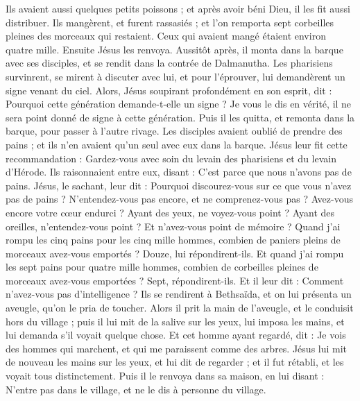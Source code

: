 \begin{multicols}{2}
Ils avaient aussi quelques petits poissons ; et après avoir béni Dieu, il les fit aussi distribuer.
Ils mangèrent, et furent rassasiés ; et l’on remporta sept corbeilles pleines des morceaux qui restaient.
Ceux qui avaient mangé étaient environ quatre mille. Ensuite Jésus les renvoya.
Aussitôt après, il monta dans la barque avec ses disciples, et se rendit dans la contrée de Dalmanutha.
Les pharisiens survinrent, se mirent à discuter avec lui, et pour l'éprouver, lui demandèrent un signe venant du ciel.
Alors, Jésus soupirant profondément en son esprit, dit : Pourquoi cette génération demande-t-elle un signe ? Je vous le dis en vérité, il ne sera point donné de signe à cette génération.
Puis il les quitta, et remonta dans la barque, pour passer à l'autre rivage.
Les disciples avaient oublié de prendre des pains ; et ils n'en avaient qu'un seul avec eux dans la barque.
Jésus leur fit cette recommandation : Gardez-vous avec soin du levain des pharisiens et du levain d'Hérode.
Ils raisonnaient entre eux, disant : C'est parce que nous n'avons pas de pains.
Jésus, le sachant, leur dit : Pourquoi discourez-vous sur ce que vous n'avez pas de pains ? N’entendez-vous pas encore, et ne comprenez-vous pas ?
Avez-vous encore votre cœur endurci ? Ayant des yeux, ne voyez-vous point ? Ayant des oreilles, n'entendez-vous point ? Et n'avez-vous point de mémoire ?
Quand j’ai rompu les cinq pains pour les cinq mille hommes, combien de paniers pleins de morceaux avez-vous emportés ? Douze, lui répondirent-ils.
Et quand j’ai rompu les sept pains pour quatre mille hommes, combien de corbeilles pleines de morceaux avez-vous emportées ? Sept, répondirent-ils.
Et il leur dit : Comment n'avez-vous pas d'intelligence ?
Ils se rendirent à Bethsaïda, et on lui présenta un aveugle, qu’on le pria de toucher.
Alors il prit la main de l'aveugle, et le conduisit hors du village ; puis il lui mit de la salive sur les yeux, lui imposa les mains, et lui demanda s'il voyait quelque chose.
Et cet homme ayant regardé, dit : Je vois des hommes qui marchent, et qui me paraissent comme des arbres.
Jésus lui mit de nouveau les mains sur les yeux, et lui dit de regarder ; et il fut rétabli, et les voyait tous distinctement.
Puis il le renvoya dans sa maison, en lui disant : N'entre pas dans le village, et ne le dis à personne du village.

\end{multicols}
